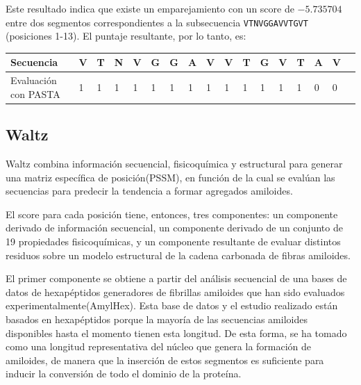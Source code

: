 Este resultado indica que existe un emparejamiento con un score de $-5.735704$ entre dos segmentos correspondientes a la subsecuencia \texttt{VTNVGGAVVTGVT} (posiciones 1-13). 
El puntaje resultante, por lo tanto, es:

\vspace{0.5cm}
\noindent
\begin{tabular}{lllllllllllllllll} 
\hline    
Secuencia & \textbf{V} & \textbf{T} & \textbf{N} & \textbf{V} & \textbf{G} & \textbf{G} & \textbf{A} & \textbf{V} & \textbf{V} &\textbf{T} & \textbf{G} & \textbf{V} & \textbf{T} & \textbf{A} & \textbf{V} \\ \hline
Evaluación con PASTA & 1 & 1 & 1 & 1 & 1 & 1 & 1 & 1 & 1 & 1 & 1 & 1 & 1 & 0 & 0 \\ \hline
\end{tabular}





\subsection{Waltz}\label{waltz}

Waltz \cite{maurer2010exploring} combina información secuencial, fisicoquímica y estructural para generar una matriz específica de posición(PSSM),
en función de la cual se evalúan las secuencias para predecir la tendencia a formar agregados amiloides.



El score para cada posición tiene, entonces, tres componentes: un componente derivado de información secuencial, un componente derivado de un conjunto de 19 propiedades fisicoquímicas, 
y un componente resultante de evaluar distintos residuos sobre un modelo estructural de la cadena carbonada de fibras amiloides.

El primer componente se obtiene a partir del análisis secuencial de una bases de datos de hexapéptidos generadores de fibrillas amiloides que han sido evaluados experimentalmente(AmylHex).
Esta base de datos y el estudio realizado están basados en hexapéptidos porque la mayoría de las secuencias amiloides disponibles hasta el momento tienen esta longitud.
De esta forma, se ha tomado como una longitud representativa del núcleo que genera la formación de amiloides, de manera que
la inserción de estos segmentos es suficiente para inducir la conversión de todo el dominio de la proteína. 

